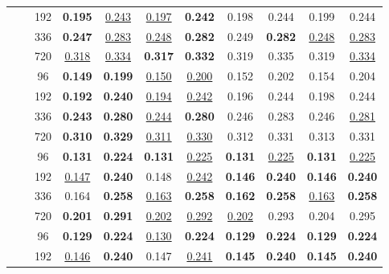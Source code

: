 \begin{table*}[!ht]
{\begin{tabular}{c|c|c|cc|cc|cc|cc}
		 & & 192 &  \textbf{0.195} & \underline{0.243} &  \underline{0.197} & \textbf{0.242} &  0.198 & 0.244 &  0.199 & 0.244 \\
		 & & 336 &  \textbf{0.247} & \underline{0.283} &  \underline{0.248} & \textbf{0.282} &  0.249 & \textbf{0.282} &  \underline{0.248} & \underline{0.283} \\
		 & & 720 &  \underline{0.318} & \underline{0.334} &  \textbf{0.317} & \textbf{0.332} &  0.319 & 0.335 &  0.319 & \underline{0.334} \\ \cmidrule{2-11}
	& \multirow{4}{*}{\rotatebox[origin=c]{90}{\text{512}}}
		 & 96 &  \textbf{0.149} & \textbf{0.199} &  \underline{0.150} & \underline{0.200} &  0.152 & 0.202 &  0.154 & 0.204 \\
		 & & 192 &  \textbf{0.192} & \textbf{0.240} &  \underline{0.194} & \underline{0.242} &  0.196 & 0.244 &  0.198 & 0.244 \\
		 & & 336 &  \textbf{0.243} & \textbf{0.280} &  \underline{0.244} & \textbf{0.280} &  0.246 & 0.283 &  0.246 & \underline{0.281} \\
		 & & 720 &  \textbf{0.310} & \textbf{0.329} &  \underline{0.311} & \underline{0.330} &  0.312 & 0.331 &  0.313 & 0.331 \\
	\midrule
	\multirow{8}{*}{\rotatebox[origin=c]{90}{\text{Electricity}}}
	& \multirow{4}{*}{\rotatebox[origin=c]{90}{\text{336}}}
		 & 96 &  \textbf{0.131} & \textbf{0.224} &  \textbf{0.131} & \underline{0.225} &  \textbf{0.131} & \underline{0.225} &  \textbf{0.131} & \underline{0.225} \\
		 & & 192 &  \underline{0.147} & \textbf{0.240} &  0.148 & \underline{0.242} &  \textbf{0.146} & \textbf{0.240} &  \textbf{0.146} & \textbf{0.240} \\
		 & & 336 &  0.164 & \textbf{0.258} &  \underline{0.163} & \textbf{0.258} &  \textbf{0.162} & \textbf{0.258} &  \underline{0.163} & \textbf{0.258} \\
		 & & 720 &  \textbf{0.201} & \textbf{0.291} &  \underline{0.202} & \underline{0.292} &  \underline{0.202} & 0.293 &  0.204 & 0.295 \\ \cmidrule{2-11}
	& \multirow{4}{*}{\rotatebox[origin=c]{90}{\text{512}}}
		 & 96 &  \textbf{0.129} & \textbf{0.224} &  \underline{0.130} & \textbf{0.224} &  \textbf{0.129} & \textbf{0.224} &  \textbf{0.129} & \textbf{0.224} \\
		 & & 192 &  \underline{0.146} & \textbf{0.240} &  0.147 & \underline{0.241} &  \textbf{0.145} & \textbf{0.240} &  \textbf{0.145} & \textbf{0.240} \\

\end{tabular}}
\end{table*}
